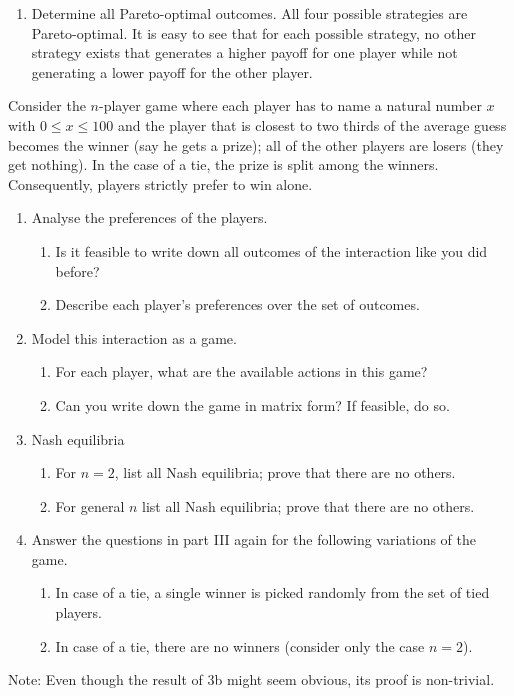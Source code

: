 \documentclass[../main.tex]{subfiles}
\begin{document}
\begin{solution}
\begin{enumerate}
	\item Determine all Pareto-optimal outcomes.
	All four possible strategies are Pareto-optimal. It is easy to see that for each possible strategy, no other strategy exists that generates a higher payoff for one player while not generating a lower payoff for the other player.
		
\end{enumerate}

\end{solution}

\begin{question}

Consider the $n$-player game where each player has to name a natural number $x$ with $ 0 \leq x \leq 100$ and the player that is closest to two thirds of the average guess becomes the winner (say he gets a prize); all of the other players are losers (they get nothing). In the case of a tie, the prize is split among the winners. Consequently, players strictly prefer to win alone.\\

\begin{enumerate}
\item Analyse the preferences of the players.
	\begin{enumerate}
	\item Is it feasible to write down all outcomes of the interaction like you did before?
	\item Describe each player’s preferences over the set of outcomes.
	\end{enumerate}
\item Model this interaction as a game.
	\begin{enumerate}
	\item For each player, what are the available actions in this game?
	\item Can you write down the game in matrix form? If feasible, do so.
	\end{enumerate}
\item Nash equilibria
	\begin{enumerate}
	\item For $n = 2$, list all Nash equilibria; prove that there are no others.
	\item For general $n$ list all Nash equilibria; prove that there are no others.
	\end{enumerate}	
\item Answer the questions in part III again for the following variations of the game.
	\begin{enumerate}
	\item In case of a tie, a single winner is picked randomly from the set of tied players.
	\item In case of a tie, there are no winners (consider only the case $n=2$).
	\end{enumerate}	
\end{enumerate}
Note: Even though the result of 3b might seem obvious, its proof is non-trivial.
\end{question}
\end{document}
